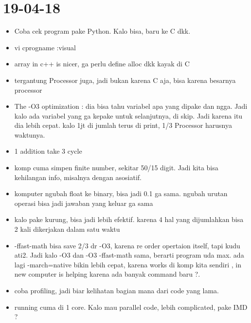 \documentclass[a4paper,10pt]{article}
\begin{document}
\section{19-04-18}
\begin{itemize}
	\item Coba cek program pake Python. Kalo bisa, baru ke C dkk.
	\item vi cprogname :visual
	\item array in c++ is nicer, ga perlu define alloc dkk kayak di C
	\item tergantung Processor juga, jadi bukan karena C aja, bisa karena besarnya processor
	\item The -O3 optimization : dia bisa tahu variabel apa yang dipake dan ngga. Jadi kalo ada variabel yang ga kepake untuk selanjutnya, di skip. Jadi karena itu dia lebih cepat. kalo 1jt di jumlah terus di print, 1/3 Processor harusnya waktunya.
	\item 1 addition take 3 cycle
	\item komp cuma simpen finite number, sekitar 50/15 digit. Jadi kita bisa kehilangan info, misalnya dengan asosiatif.
	\item komputer ngubah float ke binary, bisa jadi 0.1 ga sama. ngubah urutan operasi bisa jadi jawaban yang keluar ga sama
	\item kalo pake kurung, bisa jadi lebih efektif. karena 4 hal yang dijumlahkan bisa 2 kali dikerjakan dalam satu waktu
	\item -ffast-math bisa save 2/3 dr -O3, karena re order opertaion itself, tapi kudu ati2. Jadi kalo -O3 dan -O3 -ffast-math sama, berarti program uda max. ada lagi -march=native bikin lebih cepat, karena works di komp kita sendiri , in new computer is helping karena ada banyak command baru ?.
	\item coba profiling, jadi biar kelihatan bagian mana dari code yang lama.
	\item  running cuma di 1 core. Kalo mau parallel code, lebih complicated, pake IMD ?
\end{itemize}
\end{document}
